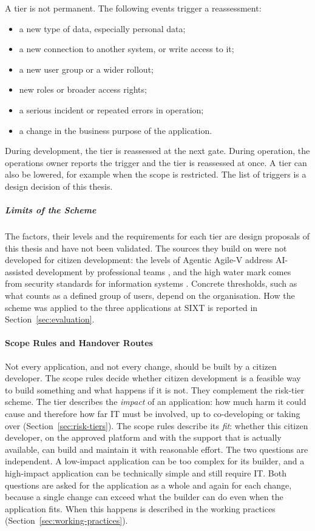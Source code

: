 \documentclass[10pt,a4paper]{article}
\begin{document}
A tier is not permanent. The following events trigger a reassessment:

\begin{itemize}
    \item a new type of data, especially personal data;
    \item a new connection to another system, or write access to it;
    \item a new user group or a wider rollout;
    \item new roles or broader access rights;
    \item a serious incident or repeated errors in operation;
    \item a change in the business purpose of the application.
\end{itemize}

During development, the tier is reassessed at the next gate. During
operation, the operations owner reports the trigger and the tier is
reassessed at once. A tier can also be lowered, for example when the
scope is restricted. The list of triggers is a design decision of this
thesis.

\subparagraph{Limits of the Scheme}

The factors, their levels and the requirements for each tier are design
proposals of this thesis and have not been validated. The sources they
build on were not developed for citizen development: the levels of
Agentic Agile-V address AI-assisted development by professional teams
\parencite{koch2026agentic}, and the high water mark comes from security
standards for information systems
\parencite{nist2004fips199,nist2006fips200}. Concrete thresholds, such
as what counts as a defined group of users, depend on the organisation.
How the scheme was applied to the three applications at SIXT is reported
in Section~\ref{sec:evaluation}.

\paragraph{Scope Rules and Handover Routes}
\label{sec:scope-rules}

Not every application, and not every change, should be built by a
citizen developer. The scope rules decide whether citizen development
is a feasible way to build something and what happens if it is not.
They complement the risk-tier scheme. The tier describes the
\emph{impact} of an application: how much harm it could cause and
therefore how far IT must be involved, up to co-developing or taking
over (Section~\ref{sec:risk-tiers}). The scope rules describe its
\emph{fit}: whether this citizen developer, on the approved platform
and with the support that is actually available, can build and
maintain it with reasonable effort. The two questions are independent.
A low-impact application can be too complex for its builder, and a
high-impact application can be technically simple and still require
IT. Both questions are asked for the application as a whole and again
for each change, because a single change can exceed what the builder
can do even when the application fits. When this happens is described
in the working practices (Section~\ref{sec:working-practices}).
\end{document}
